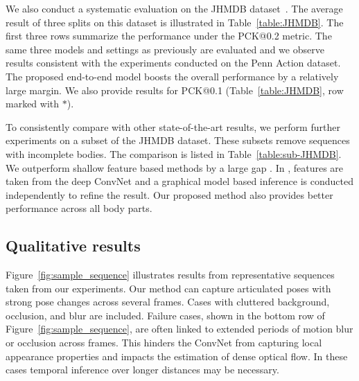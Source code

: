 \documentclass[10pt,twocolumn,letterpaper]{article}
\newcommand{\figref}[1]{Figure~\ref{#1}}
\newcommand{\reftab}[1]{Table~\ref{#1}}
\begin{document}
We also conduct a systematic evaluation on the JHMDB dataset~\cite{Jhuang:ICCV:2013}. The average result of three splits on this dataset is illustrated in \reftab{table:JHMDB}. The first three rows summarize the performance under the PCK@0.2 metric. The same three models and settings as previously are evaluated and we observe results consistent with the experiments conducted on the Penn Action dataset. The proposed end-to-end model boosts the overall performance by a relatively large margin. We also provide results for PCK@0.1 (\reftab{table:JHMDB}, row marked with $\ast$).
\begin{table}[h]
\begin{center}
\end{center}
\caption{PCK@0.2 results on sub-JHMDB dataset. We compare with other previous methods and our own baselines.}
\label{table:sub-JHMDB}
\end{table}%
To consistently compare with other state-of-the-art results, we perform further experiments on a subset of the JHMDB dataset. These subsets remove sequences with incomplete bodies. The comparison is listed in \reftab{table:sub-JHMDB}. We outperform shallow feature based methods by a large gap \cite{park2011n,xiaohan2015joint}. In \cite{iqbal2016pose}, features are taken from the deep ConvNet and a graphical model based inference is conducted independently to refine the result. Our proposed method also provides better performance across all body parts.

\subsection{Qualitative results}\figref{fig:sample_sequence} illustrates results from representative sequences taken from our experiments. Our method can capture articulated poses with strong pose changes across several frames. Cases with cluttered background, occlusion, and blur are included. Failure cases, shown in the bottom row of \figref{fig:sample_sequence}, are often linked to extended periods of motion blur or occlusion across frames. This hinders the ConvNet from capturing local appearance properties and impacts the estimation of dense optical flow. In these cases temporal inference over longer distances may be necessary.
\end{document}
